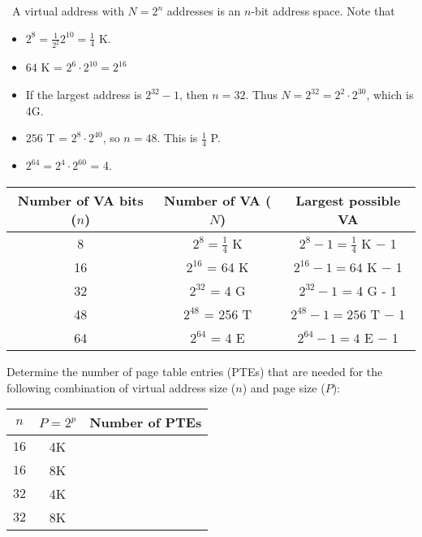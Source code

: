 \documentclass[12pt]{article}
\newenvironment{ex}[2][Exercise]{\begin{trivlist}
		\item[\hskip \labelsep {\bfseries #1}\hskip \labelsep {\bfseries #2.}]}{\end{trivlist}}
\newenvironment{sol}[1][Solution]{\begin{trivlist}
		\item[\hskip \labelsep {\bfseries #1:}]}{\end{trivlist}}
\begin{document}
\begin{sol}
	\
	A virtual address with $N=2^n$ addresses is an $n$-bit address space. Note that
	\begin{itemize}
		\item $2^8=\frac{1}{2^2}2^{10}=\frac{1}{4}$ K.
		\item $64$ K = $2^{6}\cdot 2^{10}=2^{16}$
		\item If the largest address is $2^{32}-1$, then $n=32$. Thus $N=2^{32}=2^{2}\cdot 2^{30}$,
		which is 4G.
		\item $256$ T = $2^{8}\cdot 2^{40}$, so $n=48$. This is $\frac{1}{4}$ P.
		\item $2^{64}=2^{4}\cdot 2^{60}$ = 4.
	\end{itemize}
	\begin{center}
		\begin{tabular}{ccc}
			Number of VA bits ($n$) & Number of VA ($N$) & Largest possible VA\\
			\hline
			8 & $2^{8}=\frac{1}{4}$ K & $2^{8}-1=\frac{1}{4}$ K $-$ 1\\
			16 & $2^{16}$ = 64 K & $2^{16}-1=64$ K $-$ 1\\
			32 & $2^{32}$ = 4 G & $2^{32} - 1$ = 4 G - 1\\
			48 & $2^{48}$ = 256 T & $2^{48}-1=256$ T $-$ 1\\
			64 & $2^{64}$ = 4 E & $2^{64}-1=4$ E $-$ 1
		\end{tabular}
	\end{center}
\end{sol}

\begin{ex}{9.2}
	Determine the number of page table entries (PTEs) that are needed for the following
	combination of virtual address size ($n$) and page size ($P$):
	\begin{center}
		\begin{tabular}{ccc}
			$n$ & $P=2^p$ & Number of PTEs\\
			\hline
			$16$ & 4K & \makebox[1cm]{\hrulefill}\\
			$16$ & 8K & \makebox[1cm]{\hrulefill}\\
			$32$ & 4K & \makebox[1cm]{\hrulefill}\\
			$32$ & 8K & \makebox[1cm]{\hrulefill}
		\end{tabular}
	\end{center}
\end{ex}
\end{document}
